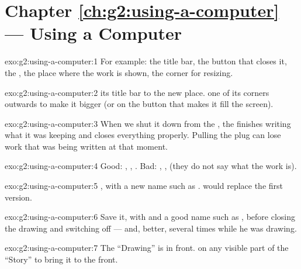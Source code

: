 \section*{Chapter \ref{ch:g2:using-a-computer} --- Using a Computer}

\begin{solution}{exo:g2:using-a-computer:1}
For example: the title bar, the button that closes it, the , the place
where the work is shown, the corner for resizing.
\end{solution}

\begin{solution}{exo:g2:using-a-computer:2}
 its title bar to the new place.  one of its corners outwards to make
it bigger (or  on the button that makes it fill the screen).
\end{solution}

\begin{solution}{exo:g2:using-a-computer:3}
When we shut it down from the , the  finishes writing what it was
keeping and closes everything properly. Pulling the plug can lose work that was
being written at that moment.
\end{solution}

\begin{solution}{exo:g2:using-a-computer:4}
Good: , , .
Bad: , ,  (they do not say what the work is).
\end{solution}

\begin{solution}{exo:g2:using-a-computer:5}
, with a new name such as .
 would replace the first version.
\end{solution}

\begin{solution}{exo:g2:using-a-computer:6}
Save it, with  and a good name such as
, before closing the drawing and switching off --- and,
better, several times while he was drawing.
\end{solution}

\begin{solution}{exo:g2:using-a-computer:7}
The  ``Drawing'' is in front.  on any visible part of the 
``Story'' to bring it to the front.
\end{solution}

